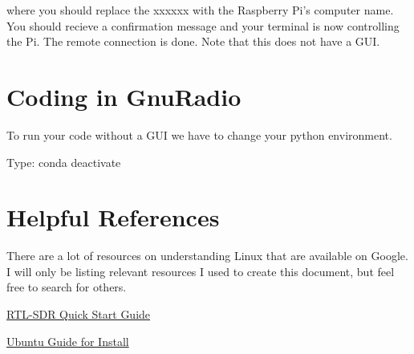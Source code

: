 \documentclass[letterpaper,12pt,notitlepage]{report} %
\begin{document}
where you should replace the xxxxxx with the Raspberry Pi's computer name. You should recieve a confirmation message and your terminal is now controlling the Pi. The remote connection is done. Note that this does not have a GUI.
\section{Coding in GnuRadio}

To run your code without a GUI we have to change your python environment. 

Type: conda deactivate
\section{Helpful References}
There are a lot of resources on understanding Linux that are available on Google. I will only be listing relevant resources I used to create this document, but feel free to search for others.

\href{https://ranous.files.wordpress.com/2020/05/rtl-sdr4linux_quickstartguidev20.pdf}{RTL-SDR Quick Start Guide}

\href{https://ubuntu.com/tutorials/how-to-install-ubuntu-desktop-on-raspberry-pi-4#1-overview}{Ubuntu Guide for Install}
\end{document}
